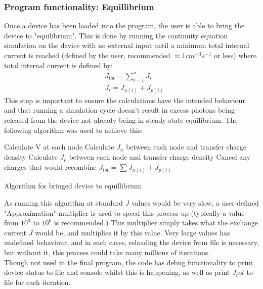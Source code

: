 \documentclass[titlepage]{article}
\begin{document}
\subsubsection{Program functionality: Equillibrium}\label{sec:Mic:Eqm}
Once a device has been loaded into the program, the user is able to bring the device to "equilibrium". This is done by running the continuity equation simulation on the device with no external input until a minimum total internal current is reached (defined by the user, recommended $\approx 1cm^{-3}s^{-1}$ or less) where total internal current is defined by:
\begin{eqnarray}
	&J_{tot} = \sum\limits_{i=1}^{n}J_i\\
	&J_i = J_{n(i)}+J_{p(i)}
\end{eqnarray}
 This step is important to ensure the calculations have the intended behaviour and that running a simulation cycle doesn't result in excess photons being released from the device not already being in steady-state equilibrium. The following algorithm was used to achieve this:
\begin{algorithm}
	{
		Calculate V at each node\;
		Calculate $J_n$ between each node and transfer charge density\;
		Calculate $J_p$ between each node and transfer charge density\;
		Cancel any charges that would recombine\;
		$J_{tot} = \sum J_{n(i)}+J_{p(i)}$
	}
\caption{\label{alg:mic:Eqm}Algorithm for bringed device to equillibrium}
\end{algorithm}
As running this algorithm at standard $J$ values would be very slow, a user-defined "Approximation" multiplier is used to speed this process up (typically a value from $10^3$ to $10^6$ is recommended.) This multiplier simply takes what the exchange current $J$ would be, and multiplies it by this value. Very large values has undefined behaviour, and in such cases, reloading the device from file is necessary, but without it, this process could take many millions of iterations. \\
Though not used in the final program, the code has debug functionality to print device status to file and console whilst this is happening, as well as print $J_tot$ to file for each iteration.
\end{document}
